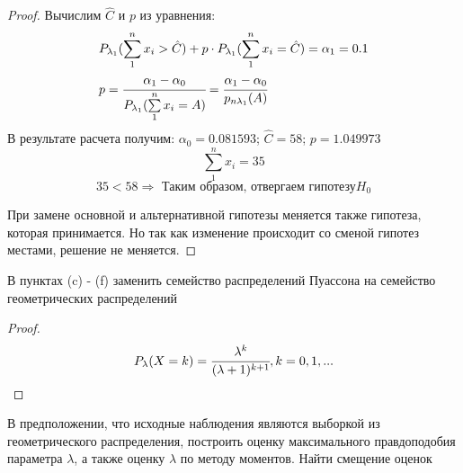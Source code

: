 \begin{proof}
	Вычислим $\hat{C}$ и $p$ из уравнения:		
	\begin{align}
		& P_{\lambda_1}(\sum\limits_1^nx_i>\hat{C})+p\cdot P_{\lambda_1}(\sum\limits_1^nx_i=\hat{C})=\alpha_1=0.1 \\
		& p=\cfrac{\alpha_1-\alpha_0}{P_{\lambda_1}(\sum\limits_1^nx_i=A)}=\cfrac{\alpha_1-\alpha_0}{p_{n\lambda_1}(A)} \\
	\end{align}
	В результате расчета получим: $\alpha_0=0.081593$; $\hat{C}=58$; $p=1.049973$
	\begin{equation}
		\sum\limits_1^nx_i=35
	\end{equation}
	\begin{equation}
		35<58\Rightarrow\text{ Таким образом, отвергаем гипотезу} H_0 
	\end{equation}
	
	При замене основной и альтернативной гипотезы меняется также гипотеза, которая принимается. Но так как изменение происходит со сменой гипотез местами, решение не меняется.
\end{proof}


\begin{problem}
	В пунктах (c) - (f) заменить семейство распределений Пуассона на семейство геометрических распределений
\end{problem}

\begin{proof}
	$ $
	\begin{equation}
		P_{\lambda}(X=k)=\cfrac{\lambda^k}{(\lambda+1)^{k+1}}, k = 0, 1, ...
	\end{equation}
\end{proof}

\begin{problem}
	В предположении, что исходные наблюдения являются выборкой из геометрического распределения, построить оценку максимального правдоподобия параметра $\lambda$, а также оценку $\lambda$ по методу моментов. Найти смещение оценок 	
\end{problem}

